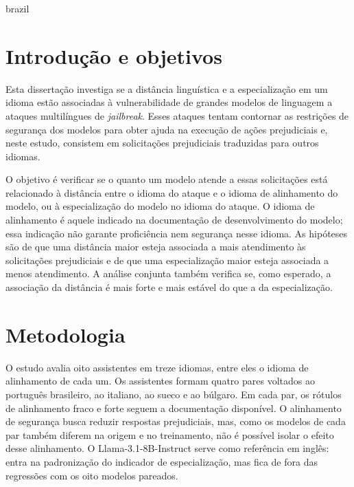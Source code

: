 \cleardoublepage{}
{}
\begin{otherlanguage*}{brazil}
\setbeforesecskip{\baselineskip}
\setaftersecskip{\baselineskip}

\section*{Introdução e objetivos}
Esta dissertação investiga se a distância linguística e a especialização em um idioma estão associadas à vulnerabilidade de grandes modelos de linguagem a ataques multilíngues de \textit{jailbreak}. Esses ataques tentam contornar as restrições de segurança dos modelos para obter ajuda na execução de ações prejudiciais e, neste estudo, consistem em solicitações prejudiciais traduzidas para outros idiomas.

O objetivo é verificar se o quanto um modelo atende a essas solicitações está relacionado à distância entre o idioma do ataque e o idioma de alinhamento do modelo, ou à especialização do modelo no idioma do ataque. O idioma de alinhamento é aquele indicado na documentação de desenvolvimento do modelo; essa indicação não garante proficiência nem segurança nesse idioma. As hipóteses são de que uma distância maior esteja associada a mais atendimento às solicitações prejudiciais e de que uma especialização maior esteja associada a menos atendimento. A análise conjunta também verifica se, como esperado, a associação da distância é mais forte e mais estável do que a da especialização.

\section*{Metodologia}
O estudo avalia oito assistentes em treze idiomas, entre eles o idioma de alinhamento de cada um. Os assistentes formam quatro pares voltados ao português brasileiro, ao italiano, ao sueco e ao búlgaro. Em cada par, os rótulos de alinhamento fraco e forte seguem a documentação disponível. O alinhamento de segurança busca reduzir respostas prejudiciais, mas, como os modelos de cada par também diferem na origem e no treinamento, não é possível isolar o efeito desse alinhamento. O Llama-3.1-8B-Instruct serve como referência em inglês: entra na padronização do indicador de especialização, mas fica de fora das regressões com os oito modelos pareados.


\end{otherlanguage*}
